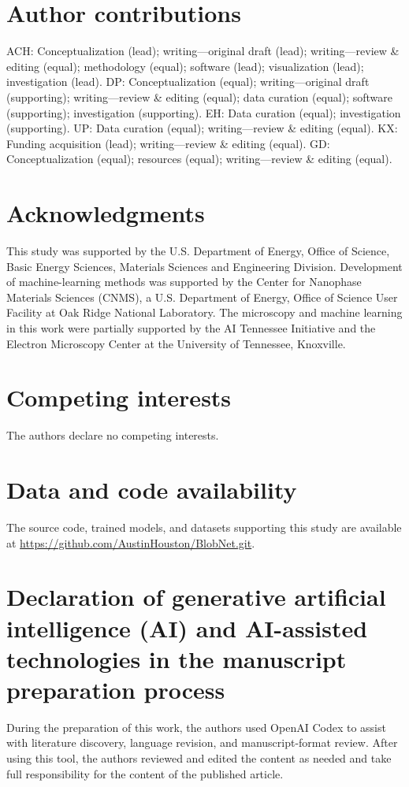 \section*{Author contributions}

ACH: Conceptualization (lead); writing---original draft (lead); writing---review \& editing (equal); methodology (equal); software (lead); visualization (lead); investigation (lead). DP: Conceptualization (equal); writing---original draft (supporting); writing---review \& editing (equal); data curation (equal); software (supporting); investigation (supporting). EH: Data curation (equal); investigation (supporting). UP: Data curation (equal); writing---review \& editing (equal). KX: Funding acquisition (lead); writing---review \& editing (equal). GD: Conceptualization (equal); resources (equal); writing---review \& editing (equal).

\section*{Acknowledgments}

This study was supported by the U.S. Department of Energy, Office of Science, Basic Energy Sciences, Materials Sciences and Engineering Division. Development of machine-learning methods was supported by the Center for Nanophase Materials Sciences (CNMS), a U.S. Department of Energy, Office of Science User Facility at Oak Ridge National Laboratory. The microscopy and machine learning in this work were partially supported by the AI Tennessee Initiative and the Electron Microscopy Center at the University of Tennessee, Knoxville.

\section*{Competing interests}

The authors declare no competing interests.

\section*{Data and code availability}

The source code, trained models, and datasets supporting this study are available at \url{https://github.com/AustinHouston/BlobNet.git}.

\section*{Declaration of generative artificial intelligence (AI) and AI-assisted technologies in the manuscript preparation process}

During the preparation of this work, the authors used OpenAI Codex to assist with literature discovery, language revision, and manuscript-format review. After using this tool, the authors reviewed and edited the content as needed and take full responsibility for the content of the published article.
